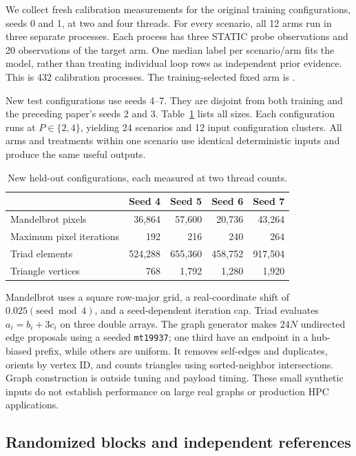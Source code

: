 \documentclass[conference]{IEEEtran}
\newcommand{\code}[1]{\texttt{#1}}
\begin{document}
We collect fresh calibration measurements for the original training
configurations, seeds 0 and 1, at two and four threads. For every scenario,
all 12 arms run in three separate processes. Each process has three STATIC
probe observations and 20 observations of the target arm. One median label
per scenario/arm fits the model, rather than treating individual loop rows
as independent prior evidence. This is 432 calibration processes.
The training-selected fixed arm is \BestFixedArm{}.

New test configurations use seeds 4--7. They are disjoint from both training
and the preceding paper's seeds 2 and 3. Table~\ref{tab:inputs} lists all sizes.
Each configuration runs at $P\in\{2,4\}$, yielding 24 scenarios and 12 input
configuration clusters. All arms and treatments within one scenario use
identical deterministic inputs and produce the same useful outputs.

\begin{table}[t]
\centering\small
\caption{New held-out configurations, each measured at two thread counts.}
\label{tab:inputs}
\begin{tabular}{lrrrr}
\hline
 & Seed 4 & Seed 5 & Seed 6 & Seed 7\\
\hline
Mandelbrot pixels & 36,864 & 57,600 & 20,736 & 43,264\\
Maximum pixel iterations & 192 & 216 & 240 & 264\\
Triad elements & 524,288 & 655,360 & 458,752 & 917,504\\
Triangle vertices & 768 & 1,792 & 1,280 & 1,920\\
\hline
\end{tabular}
\end{table}

Mandelbrot uses a square row-major grid, a real-coordinate shift of
$0.025(\mathrm{seed}\bmod4)$, and a seed-dependent iteration cap.
Triad evaluates $a_i=b_i+3c_i$ on three double arrays. The graph generator
makes $24N$ undirected edge proposals using a seeded \code{mt19937}; one third
have an endpoint in a hub-biased prefix, while others are uniform. It removes
self-edges and duplicates, orients by vertex ID, and counts triangles using
sorted-neighbor intersections. Graph construction is outside tuning and
payload timing. These small synthetic inputs do not establish performance
on large real graphs or production HPC applications.

\subsection{Randomized blocks and independent references}
\end{document}
